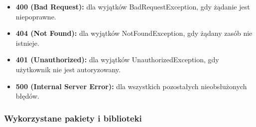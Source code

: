 \documentclass[12pt,a4paper]{article}
\begin{document}
\begin{itemize}
    \item \textbf{400 (Bad Request):} dla wyjątków BadRequestException, gdy żądanie jest niepoprawne.
    \item \textbf{404 (Not Found):} dla wyjątków NotFoundException, gdy żądany zasób nie istnieje.
    \item \textbf{401 (Unauthorized):} dla wyjątków UnauthorizedException, gdy użytkownik nie jest autoryzowany.
    \item \textbf{500 (Internal Server Error):} dla wszystkich pozostałych nieobsłużonych błędów.
\end{itemize}

\newpage

\subsubsection{Wykorzystane pakiety i biblioteki}
\end{document}
